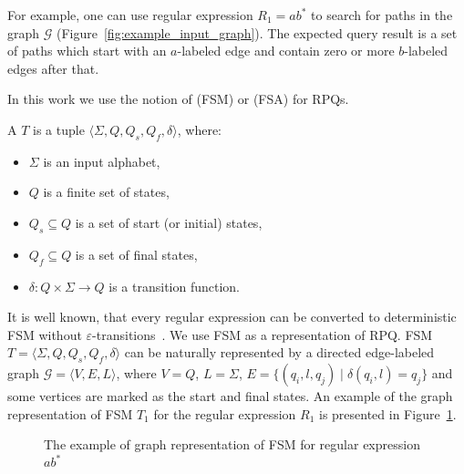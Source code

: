 For example, one can use regular expression $R_1 = ab^*$ to search for paths in the graph $\mathcal{G}$ (Figure~\ref{fig:example_input_graph}).
The expected query result is a set of paths which start with an $a$-labeled edge and contain zero or more $b$-labeled edges after that.

In this work we use the notion of  (FSM) or  (FSA) for RPQs.

\begin{definition}
A  $T$ is a tuple $\langle \Sigma, Q, Q_s, Q_f, \delta \rangle$, where:
\begin{itemize}
    \item $\Sigma$ is an input alphabet,
    \item $Q$ is a finite set of states,
    \item $Q_s \subseteq Q$ is a set of start (or initial) states,
    \item $Q_f \subseteq Q$ is a set of final states,
    \item $\delta: Q \times \Sigma \to Q$ is a transition function.
\end{itemize}
\end{definition}

It is well known, that every regular expression can be converted to deterministic FSM without $\varepsilon$-transitions~\citep{automata:theory:10.5555/1177300}.
We use FSM as a representation of RPQ.
FSM $T = \langle \Sigma, Q, Q_s, Q_f, \delta \rangle$ can be naturally represented by a directed edge-labeled graph $\mathcal{G} = \langle V,E,L \rangle$, where $V = Q$, $L = \Sigma$, $E = \{(q_i,l,q_j) \mid \delta(q_i,l) = q_j\}$ and some vertices are marked as the start and final states.
An example of the graph representation of FSM $T_1$ for the regular expression $R_1$ is presented in Figure~\ref{fig:example_fsm}.

\begin{figure}[h]
    \centering
    \caption{The example of graph representation of FSM for regular expression $ab^*$}
    \label{fig:example_fsm}
\end{figure}

